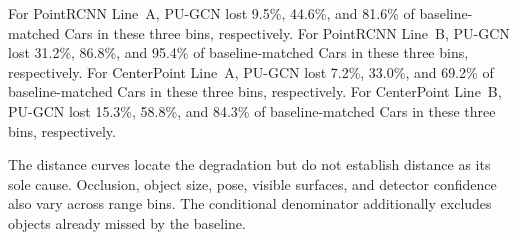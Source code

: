 For PointRCNN Line~A, PU-GCN lost 9.5\%, 44.6\%, and 81.6\% of baseline-matched Cars in these three bins, respectively.
For PointRCNN Line~B, PU-GCN lost 31.2\%, 86.8\%, and 95.4\% of baseline-matched Cars in these three bins, respectively.
For CenterPoint Line~A, PU-GCN lost 7.2\%, 33.0\%, and 69.2\% of baseline-matched Cars in these three bins, respectively.
For CenterPoint Line~B, PU-GCN lost 15.3\%, 58.8\%, and 84.3\% of baseline-matched Cars in these three bins, respectively.

The distance curves locate the degradation but do not establish
distance as its sole cause. Occlusion, object size, pose, visible
surfaces, and detector confidence also vary across range bins.
The conditional denominator additionally excludes objects already
missed by the baseline.

